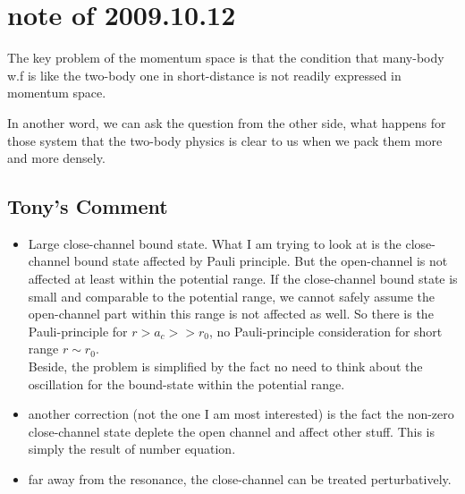 \section{note of 2009.10.12}
The key problem of the momentum space is that the condition that many-body w.f is like the two-body one in short-distance is not readily expressed in momentum space. 

In another word, we can ask the question from the other side, what happens for those system that the two-body physics is clear to us when we pack them more and more densely.  

\subsection{Tony's Comment}
\begin{itemize}
\item Large close-channel bound state.  What I am trying to look at is the close-channel bound state affected by Pauli principle.  But the open-channel is not affected at least within the potential range.  If the close-channel bound state is small and comparable to the potential range, we cannot safely assume the open-channel part within this range is not affected as well.   So there is the Pauli-principle for $r>a_c>>r_0$, no Pauli-principle consideration for short range $r\sim{r_0}$.  \\ Beside, the problem is simplified by the fact no need to think about the oscillation for the bound-state within the potential range. 
\item another correction (not the one I am most interested) is the fact the non-zero close-channel state deplete the open channel and affect other stuff.  This is simply the result of number equation. 
\item far away from the resonance, the close-channel can be treated perturbatively. 
\end{itemize}
